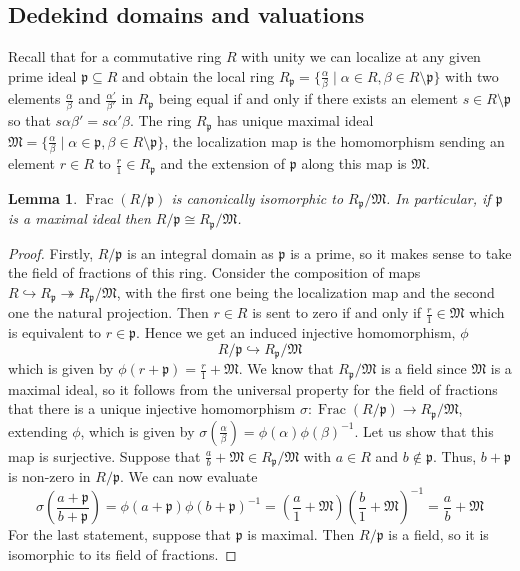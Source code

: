 \documentclass{article}
\DeclareMathOperator{\Frac}{Frac}
\newtheorem{lemma}{Lemma}[section]
\newcommand{\mfrak}[1]{\mathfrak{#1}}
\numberwithin{equation}{section}
\begin{document}
\subsection{Dedekind domains and valuations}
Recall that for a commutative ring $R$ with unity we can localize at any given prime ideal $\mfrak p \subseteq R$ and obtain the local ring $R_\mfrak p = \{\frac{\alpha}{\beta} \mid \alpha \in R, \beta \in R \setminus \mfrak p \}$ with two elements $\frac{\alpha}{\beta}$ and  $\frac{\alpha'}{\beta'}$ in $R_\mfrak p$ being equal if and only if there exists an element $s \in R \setminus \mfrak p$ so that $s\alpha \beta' = s\alpha' \beta$. The ring $R_\mfrak p$ has unique maximal ideal $\mfrak M =  \{\frac{\alpha}{\beta} \mid \alpha \in \mfrak p, \beta \in R\setminus \mfrak p \}$, the localization map is the homomorphism sending an element $r \in R$ to $\frac{r}{1} \in R_\mfrak p$ and the extension of $\mfrak p$ along this map is $\mfrak M$.

\begin{lemma} \label{lem: Canonical localization isomorphism}
	$\Frac(R / \mfrak p)$ is canonically isomorphic to $R_\mfrak p / \mfrak M$. In particular, if $\mfrak p$ is a maximal ideal then $R / \mfrak p \cong R_\mfrak p / \mfrak M$.
\end{lemma}
\begin{proof}
	Firstly, $R / \mfrak p$ is an integral domain as $\mfrak p$ is a prime, so it makes sense to take the field of fractions of this ring. Consider the composition of maps $R \hookrightarrow R_\mfrak p \twoheadrightarrow R_\mfrak p / \mfrak M$, with the first one being the localization map and the second one the natural projection. Then $r \in R$ is sent to zero if and only if $\frac{r}{1} \in \mfrak M$ which is equivalent to $r \in \mfrak p$. Hence we get an induced injective homomorphism, $\phi$
	$$R / \mfrak p \hookrightarrow R_\mfrak p / \mfrak M$$
	which is given by $\phi(r + \mfrak p) = \frac{r}{1} + \mfrak M$. We know that $R_\mfrak p / \mfrak M$ is a field since $\mfrak M$ is a maximal ideal, so it follows from the universal property for the field of fractions that there is a unique injective homomorphism $\sigma : \Frac(R / \mfrak p) \to R_\mfrak p / \mfrak M$, extending $\phi$, which is given by $\sigma(\frac{\alpha}{\beta}) = \phi(\alpha)\phi(\beta)^{-1}$. Let us show that this map is surjective. Suppose that $\frac{a}{b} + \mfrak M  \in R_\mfrak p / \mfrak M$ with $a \in R$ and $b \notin \mfrak p$. Thus, $b + \mfrak p$ is non-zero in $R / \mfrak p$. We can now evaluate
	$$\sigma(\frac{a + \mfrak p}{b + \mfrak p}) = \phi(a + \mfrak p)\phi(b + \mfrak p)^{-1} = (\frac{a}{1} + \mfrak M) (\frac{b}{1} + \mfrak M)^{-1} = \frac{a}{b} + \mfrak M$$
	For the last statement, suppose that $\mfrak p$ is maximal. Then $R / \mfrak p$ is a field, so it is isomorphic to its field of fractions.
\end{proof}
\end{document}
